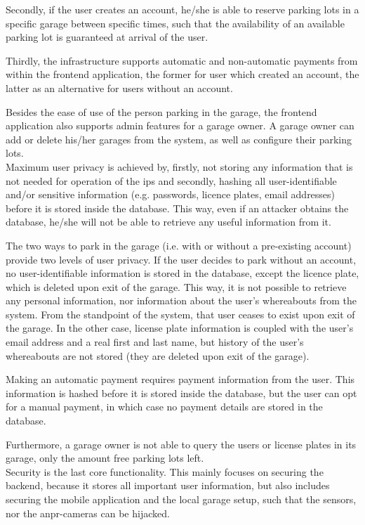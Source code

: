 \ind Secondly, if the user creates an account, he/she is able to reserve parking lots in a specific garage between specific times, such that the availability of an available parking lot is guaranteed at arrival of the user.

\ind Thirdly, the infrastructure supports automatic and non-automatic payments from within the frontend application, the former for user which created an account, the latter as an alternative for users without an account. 

\ind Besides the ease of use of the person parking in the garage, the frontend application also supports admin features for a garage owner. A garage owner can add or delete his/her garages from the system, as well as configure their parking lots. \\


Maximum user privacy is achieved by, firstly, not storing any information that is not needed for operation of the \ac{ips} and secondly, hashing all user-identifiable and/or sensitive information (e.g. passwords, licence plates, email addresses) before it is stored inside the database. This way, even if an attacker obtains the database, he/she will not be able to retrieve any useful information from it.

\ind The two ways to park in the garage (i.e. with or without a pre-existing account) provide two levels of user privacy. If the user decides to park without an account, no user-identifiable information is stored in the database, except the licence plate, which is deleted upon exit of the garage. This way, it is not possible to retrieve any personal information, nor information about the user's whereabouts from the system. From the standpoint of the system, that user ceases to exist upon exit of the garage. In the other case, license plate information is coupled with the user's email address and a real first and last name, but history of the user's whereabouts are not stored (they are deleted upon exit of the garage).

\ind Making an automatic payment requires payment information from the user. This information is hashed before it is stored inside the database, but the user can opt for a manual payment, in which case no payment details are stored in the database.

\ind Furthermore, a garage owner is not able to query the users or license plates in its garage, only the amount free parking lots left. \\ 

Security is the last core functionality. This mainly focuses on securing the backend, because it stores all important user information, but also includes securing the mobile application and the local garage setup, such that the sensors, nor the \ac{anpr}-cameras can be hijacked. 

